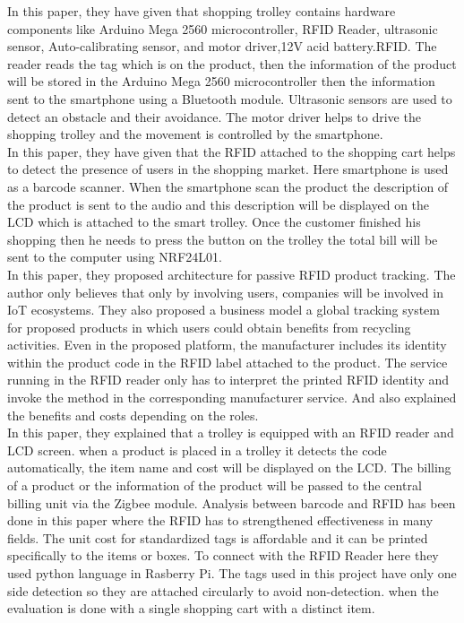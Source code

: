 \documentclass[conference]{IEEEtran}
\begin{document}
In this paper\cite{b19}, they have given that shopping trolley contains hardware components like Arduino Mega 2560 microcontroller, RFID Reader, ultrasonic sensor, Auto-calibrating sensor, and motor driver,12V acid battery.RFID. The reader reads the tag which is on the product, then the information of the product will be stored in the Arduino Mega 2560 microcontroller then the information sent to the smartphone using a Bluetooth module. Ultrasonic sensors are used to detect an obstacle and their avoidance. The motor driver helps to drive the shopping trolley and the movement is controlled by the smartphone.\\

In this paper\cite{b20}, they have given that the RFID attached to the shopping cart helps to detect the presence of users in the shopping market. Here smartphone is used as a barcode scanner. When the smartphone scan the product the description of the product is sent to the audio and this description will be displayed on the LCD which is attached to the smart trolley. Once the customer finished his shopping then he needs to press the button on the trolley the total bill will be sent to the computer using NRF24L01.\\

In this paper\cite{b21}, they proposed architecture for passive RFID product tracking. The author only believes that only by involving users, companies will be involved in IoT ecosystems. They also proposed a business model a global tracking system for proposed products in which users could obtain benefits from recycling activities. Even in the proposed platform, the manufacturer includes its identity within the product code in the RFID label attached to the product. The service running in the RFID reader only has to interpret the printed RFID identity and invoke the method in the corresponding manufacturer service. And also explained the benefits and costs depending on the roles.\\

In this paper\cite{b22}, they explained that a trolley is equipped with an RFID reader and LCD screen. when a product is placed in a trolley it detects the code automatically, the item name and cost will be displayed on the LCD. The billing of a product or the information of the product will be passed to the central billing unit via the Zigbee module. Analysis between barcode and RFID has been done in this paper where the RFID has to strengthened effectiveness in many fields. The unit cost for standardized tags is affordable and it can be printed specifically to the items or boxes. To connect with the RFID Reader here they used python language in Rasberry Pi. The tags used in this project have only one side detection so they are attached circularly to avoid non-detection. when the evaluation is done with a single shopping cart with a distinct item.\\
\end{document}
